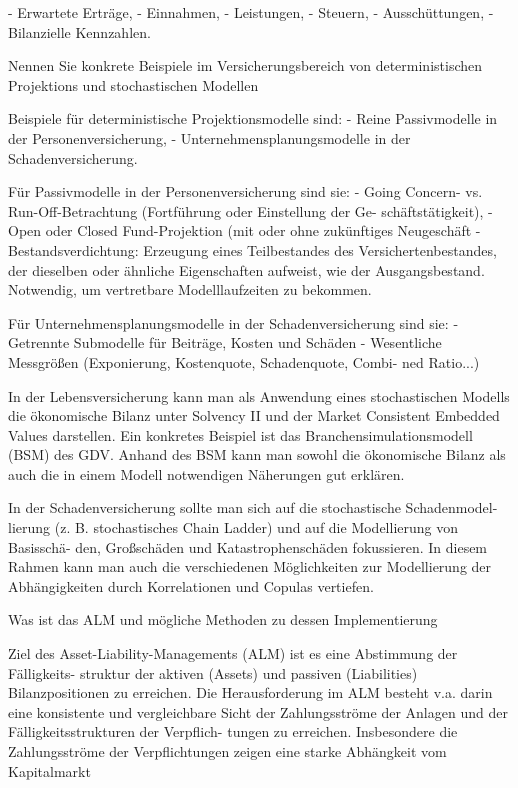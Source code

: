 - Erwartete Erträge,
- Einnahmen,
- Leistungen,
- Steuern,
- Ausschüttungen,
- Bilanzielle Kennzahlen.






Nennen Sie konkrete Beispiele im Versicherungsbereich von deterministischen Projektions und stochastischen Modellen


Beispiele für deterministische Projektionsmodelle sind:
- Reine Passivmodelle in der Personenversicherung,
- Unternehmensplanungsmodelle in der Schadenversicherung.

Für Passivmodelle in der Personenversicherung sind sie:
- Going Concern- vs. Run-Off-Betrachtung (Fortführung oder Einstellung der Ge-
schäftstätigkeit),
- Open oder Closed Fund-Projektion (mit oder ohne zukünftiges Neugeschäft
- Bestandsverdichtung: Erzeugung eines Teilbestandes des Versichertenbestandes, der dieselben oder ähnliche Eigenschaften aufweist, wie der Ausgangsbestand. Notwendig, um vertretbare Modelllaufzeiten zu bekommen.

Für Unternehmensplanungsmodelle in der Schadenversicherung sind sie:
- Getrennte Submodelle für Beiträge, Kosten und Schäden
- Wesentliche Messgrößen (Exponierung, Kostenquote, Schadenquote, Combi-
ned Ratio...)

In der Lebensversicherung kann man als Anwendung eines stochastischen Modells
die ökonomische Bilanz unter Solvency II und der Market Consistent Embedded
Values darstellen. Ein konkretes Beispiel ist das Branchensimulationsmodell (BSM)
des GDV. Anhand des BSM kann man sowohl die ökonomische Bilanz als auch die in
einem Modell notwendigen Näherungen gut erklären.

In der Schadenversicherung sollte man sich auf die stochastische Schadenmodel-
lierung (z. B. stochastisches Chain Ladder) und auf die Modellierung von Basisschä-
den, Großschäden und Katastrophenschäden fokussieren. In diesem Rahmen kann
man auch die verschiedenen Möglichkeiten zur Modellierung der Abhängigkeiten
durch Korrelationen und Copulas vertiefen.


Was ist das ALM und mögliche Methoden zu dessen Implementierung 

Ziel des Asset-Liability-Managements (ALM) ist es eine Abstimmung der Fälligkeits-
struktur der aktiven (Assets) und passiven (Liabilities) Bilanzpositionen zu erreichen.
Die Herausforderung im ALM besteht v.a. darin eine konsistente und vergleichbare
Sicht der Zahlungsströme der Anlagen und der Fälligkeitsstrukturen der Verpflich-
tungen zu erreichen. Insbesondere die Zahlungsströme der Verpflichtungen zeigen
eine starke Abhängkeit vom Kapitalmarkt


